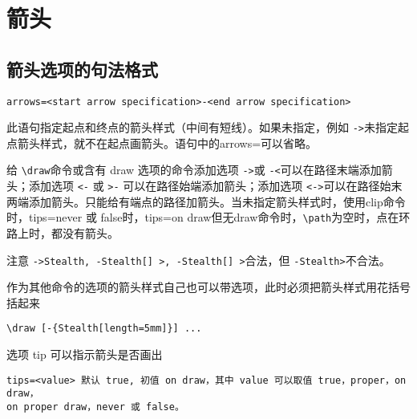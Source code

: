 \documentclass[UTF8]{ctexart}
\begin{document}
\section{箭头}

\subsection{箭头选项的句法格式}

\begin{lstlisting}
arrows=<start arrow specification>-<end arrow specification>
\end{lstlisting}
此语句指定起点和终点的箭头样式（中间有短线）。如果未指定，例如 \verb!->!未指定起点箭头样式，就不在起点画箭头。语句中的arrows=可以省略。

给 \verb!\draw!命令或含有 draw 选项的命令添加选项 \verb!->!或 \verb!-<!可以在路径末端添加箭头；添加选项 \verb!<-! 或 \verb!>-! 可以在路径始端添加箭头；添加选项 \verb!<->!可以在路径始末两端添加箭头。只能给有端点的路径加箭头。当未指定箭头样式时，使用clip命令时，tips=never 或 false时，tips=on draw但无draw命令时，\verb!\path!为空时，点在环路上时，都没有箭头。

注意 \verb!->Stealth, -Stealth[] >, -Stealth[] >!合法，但 \verb!-Stealth>!不合法。


作为其他命令的选项的箭头样式自己也可以带选项，此时必须把箭头样式用花括号括起来
\begin{lstlisting}
\draw [-{Stealth[length=5mm]}] ...
\end{lstlisting}

选项 tip 可以指示箭头是否画出
\begin{lstlisting}
tips=<value> 默认 true, 初值 on draw，其中 value 可以取值 true，proper，on draw，
on proper draw，never 或 false。
\end{lstlisting}
\end{document}
